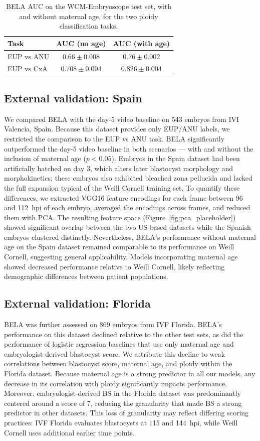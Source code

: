 \documentclass[10pt]{article}
\begin{document}
\begin{table}[htbp]
\centering
\caption{BELA AUC on the WCM-Embryoscope test set, with and without maternal
age, for the two ploidy classification tasks.}
\label{tab:auc_wcm}
\begin{tabular}{lcc}
\toprule
Task & AUC (no age) & AUC (with age) \\
\midrule
EUP vs ANU & $0.66 \pm 0.008$  & $0.76 \pm 0.002$ \\
EUP vs CxA & $0.708 \pm 0.004$ & $0.826 \pm 0.004$ \\
\bottomrule
\end{tabular}
\end{table}

\subsection{External validation: Spain}
We compared BELA with the day-5 video baseline on 543 embryos from IVI Valencia,
Spain. Because this dataset provides only EUP/ANU labels, we restricted the
comparison to the EUP vs ANU task. BELA significantly outperformed the day-5
video baseline in both scenarios --- with and without the inclusion of maternal
age ($p < 0.05$). Embryos in the Spain dataset had been artificially hatched on
day 3, which alters later blastocyst morphology and morphokinetics; these
embryos also exhibited bleached zona pellucida and lacked the full expansion
typical of the Weill Cornell training set. To quantify these differences, we
extracted VGG16 feature encodings for each frame between 96 and 112~hpi of each
embryo, averaged the encodings across frames, and reduced them with PCA. The
resulting feature space (Figure~\ref{fig:pca_placeholder}) showed significant
overlap between the two US-based datasets while the Spanish embryos clustered
distinctly. Nevertheless, BELA's performance without maternal age on the Spain
dataset remained comparable to its performance on Weill Cornell, suggesting
general applicability. Models incorporating maternal age showed decreased
performance relative to Weill Cornell, likely reflecting demographic differences
between patient populations.

\subsection{External validation: Florida}
BELA was further assessed on 869 embryos from IVF Florida. BELA's performance
on this dataset declined relative to the other test sets, as did the
performance of logistic regression baselines that use only maternal age and
embryologist-derived blastocyst score. We attribute this decline to weak
correlations between blastocyst score, maternal age, and ploidy within the
Florida dataset. Because maternal age is a strong predictor in all our models,
any decrease in its correlation with ploidy significantly impacts performance.
Moreover, embryologist-derived BS in the Florida dataset was predominantly
centered around a score of 7, reducing the granularity that made BS a strong
predictor in other datasets. This loss of granularity may reflect differing
scoring practices: IVF Florida evaluates blastocysts at 115 and 144~hpi, while
Weill Cornell uses additional earlier time points.
\end{document}

